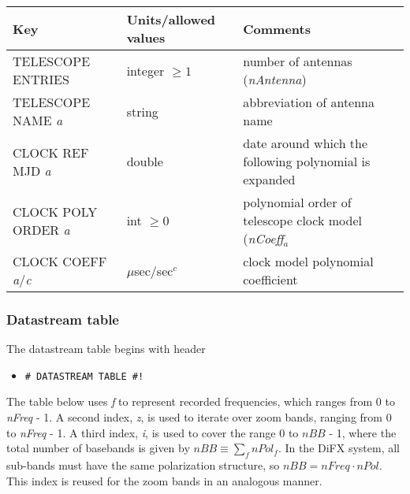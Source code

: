 \begin{center}
\begin{tabular}{l l l}
\hline
Key & Units/allowed values & Comments \\
\hline
TELESCOPE ENTRIES & integer $\ge 1$ & number of antennas ({\em nAntenna}) \\
\hline
TELESCOPE NAME {\em a} & string & abbreviation of antenna name \\
CLOCK REF MJD {\em a} & double & date around which the following polynomial is expanded \\
CLOCK POLY ORDER {\em a} & int $\ge 0$ & polynomial order of telescope clock model ({\em nCoeff}$_a$\\
CLOCK COEFF {\em a}/{\em c} & $\mu$sec/sec$^c$ & clock model polynomial coefficient \\
\hline
\end{tabular}
\end{center}


\subsubsection{Datastream table} \label{table:datastream}

The datastream table begins with header 
\begin{itemize}
\item[] {\tt \verb+# DATASTREAM TABLE #!+}
\end{itemize}
The table below uses {\em f} to represent recorded frequencies, which ranges from 0 to {\em nFreq} - 1.
A second index, {\em z}, is used to iterate over zoom bands, ranging from 0 to {\em nFreq} - 1.
A third index, {\em i}, is used to cover the range 0 to $\mathit{nBB}$ - 1, where the total number of basebands is given by $\mathit{nBB} \equiv \sum_f \mathit{nPol}_f$.
In the DiFX system, all sub-bands must have the same polarization structure, so $\mathit{nBB} = \mathit{nFreq} \cdot \mathit{nPol}$.
This index is reused for the zoom bands in an analogous manner.

